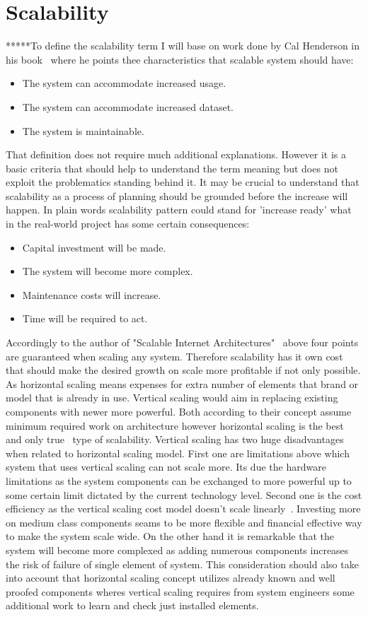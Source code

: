\section{Scalability}\label{sec:scalability}
*****To define the scalability term I will base on work done by Cal Henderson in his book~\cite[pages 203--204]{build_scalable} where he points thee characteristics that scalable system should have:
\begin{itemize}
\item{The system can accommodate increased usage.}
\item{The system can accommodate increased dataset.}
\item{The system is maintainable.}
\end{itemize}
That definition does not require much additional explanations. However it is a basic criteria that should help to understand the term meaning but does not exploit the problematics standing behind it. It may be crucial to understand that scalability as a process of planning should be grounded before the increase will happen. In plain words scalability pattern could stand for 'increase ready' what in the real-world project has some certain consequences:
\begin{itemize}
\item{Capital investment will be made.}
\item{The system will become more complex.}
\item{Maintenance costs will increase.}
\item{Time will be required to act.}
\end{itemize}
Accordingly to the author of  "Scalable Internet Architectures"~\cite[page 8]{scalable_arch} above four points are guaranteed when scaling any system. Therefore scalability has it own cost that should make the desired growth on scale more profitable if not only possible. As horizontal scaling means expenses for extra number of elements that brand or model that is already in use. Vertical scaling would aim in replacing existing components with newer more powerful. Both according to their concept assume minimum required work on architecture however horizontal scaling is the best and only true~\cite[page 5]{scalable_arch} type of scalability. Vertical scaling has two huge disadvantages when related to horizontal scaling model. First one are limitations above which system that uses vertical scaling can not scale more. Its due the hardware limitations as the system components can be exchanged to more powerful up to some certain limit dictated by the current technology level. Second one is the cost efficiency as the vertical scaling cost model doesn't scale linearly~\cite[page 204]{build_scalable}. Investing more on medium class components seams to be more flexible and financial effective way to make the system scale wide. On the other hand it is remarkable that the system will become more complexed as adding numerous components increases the risk of failure of single element of system. This consideration should also take into account that horizontal scaling concept utilizes already known and well proofed components wheres vertical scaling requires from system engineers some additional work to learn and check just installed elements.


